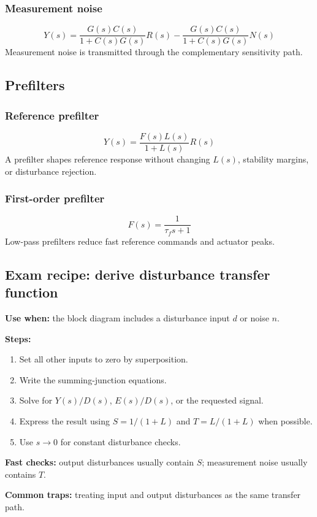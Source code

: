 \subsubsection{Measurement noise}
\[
Y(s)=\frac{G(s)C(s)}{1+C(s)G(s)}R(s)
-\frac{G(s)C(s)}{1+C(s)G(s)}N(s)
\]
Measurement noise is transmitted through the complementary sensitivity path.

\subsection{Prefilters}

\subsubsection{Reference prefilter}
\[
Y(s)=\frac{F(s)L(s)}{1+L(s)}R(s)
\]
A prefilter shapes reference response without changing \(L(s)\), stability margins, or disturbance rejection.

\subsubsection{First-order prefilter}
\[
F(s)=\frac{1}{\tau_f s+1}
\]
Low-pass prefilters reduce fast reference commands and actuator peaks.

\subsection{Exam recipe: derive disturbance transfer function}

\textbf{Use when:} the block diagram includes a disturbance input \(d\) or noise \(n\).

\textbf{Steps:}
\begin{enumerate}
\item Set all other inputs to zero by superposition.
\item Write the summing-junction equations.
\item Solve for \(Y(s)/D(s)\), \(E(s)/D(s)\), or the requested signal.
\item Express the result using \(S=1/(1+L)\) and \(T=L/(1+L)\) when possible.
\item Use \(s\to0\) for constant disturbance checks.
\end{enumerate}

\textbf{Fast checks:} output disturbances usually contain \(S\); measurement noise usually contains \(T\).

\textbf{Common traps:} treating input and output disturbances as the same transfer path.


